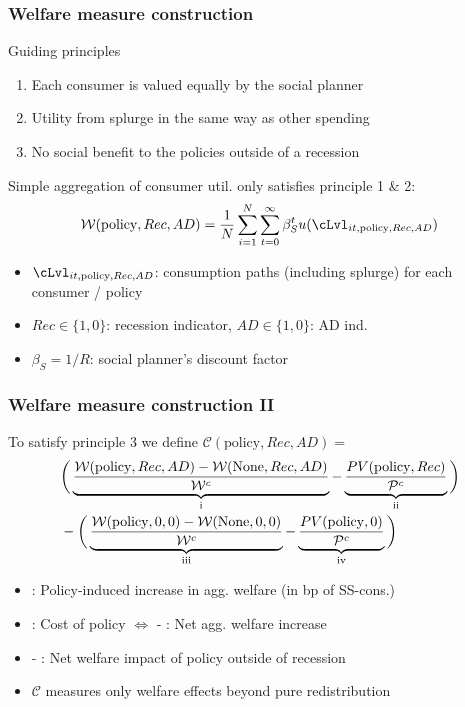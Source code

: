 \documentclass[pdflatex,aspectratio=169]{beamer}
\newcommand{\RNum}[1]{\uppercase\expandafter{\romannumeral #1\relax}}
\begin{document}
\begin{frame}
\frametitle{Welfare measure construction}

	Guiding principles
	
	\begin{enumerate}
		\item Each consumer is valued equally by the social planner 
		\item Utility from splurge in the same way as other spending
		\item No social benefit to the policies outside of a recession
	\end{enumerate} 
	
	\vspace{0.6cm}
	
	Simple aggregation of consumer util. only satisfies principle 1 \& 2:
	\begin{align*}
	\mathcal{W}(\text{policy},Rec,AD) =\frac{1}{N}\sum_{i=1}^{N} \sum_{t=0}^{\infty} \beta_S^t u(\cLvl_{it,\text{policy},Rec,AD}) 
	\end{align*}
	
	\begin{itemize}
		\item $\cLvl_{it,\text{policy},Rec,AD}$: consumption paths (including splurge) for each consumer / policy
		\item $Rec\in\{1,0\}$: recession indicator, $AD\in\{1,0\}$: AD ind.
		\item $\beta_S = 1/R$: social planner's discount factor 
	\end{itemize}	

\end{frame}


\begin{frame}
\frametitle{Welfare measure construction II}

	To satisfy principle 3 we define $\mathcal{C}(\text{policy},Rec,AD) =$
	\begin{align*}
	& \bigg( \underbrace{\frac{\mathcal{W}(\text{policy},Rec,AD)-\mathcal{W}(\text{None},Rec,AD)}{\mathcal{W}^c}}_\text{\RNum{1}}  - \underbrace{\frac{PV(\text{policy},Rec)}{\mathcal{P}^c} }_\text{\RNum{2}} \bigg) \nonumber \\  
	& -
	\bigg( \underbrace{\frac{\mathcal{W}(\text{policy},0,0) - \mathcal{W}(\text{None},0,0)}{\mathcal{W}^c}}_\text{\RNum{3}}  - \underbrace{\frac{PV(\text{policy},0)}{\mathcal{P}^c}}_\text{\RNum{4}}  \bigg) 
	\end{align*}
	
	\begin{itemize}
		\item \RNum{1}: Policy-induced increase in agg. welfare (in bp of SS-cons.)
		\item \RNum{2}: Cost of policy $\Leftrightarrow$ \RNum{1} - \RNum{2}: Net agg. welfare increase
		\item \RNum{3} - \RNum{4}: Net welfare impact of policy outside of recession
		\item $\mathcal{C}$ measures only welfare effects beyond pure redistribution
	\end{itemize}

\end{frame}
\end{document}
